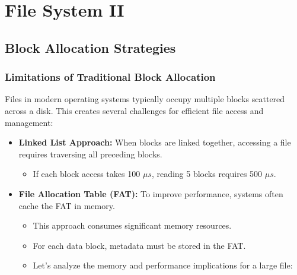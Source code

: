\chapter{File System II}
\vfill
\section{Block Allocation Strategies}
\subsection{Limitations of Traditional Block Allocation}

Files in modern operating systems typically occupy multiple blocks scattered across a disk. This creates several challenges for efficient file access and management:

\begin{itemize}
  \item \textbf{Linked List Approach:} When blocks are linked together, accessing a file requires traversing all preceding blocks.
    \begin{itemize}
      \item If each block access takes 100 $\mu s$, reading 5 blocks requires 500 $\mu s$.
    \end{itemize}
  
  \item \textbf{File Allocation Table (FAT):} To improve performance, systems often cache the FAT in memory.
    \begin{itemize}
      \item This approach consumes significant memory resources.
      \item For each data block, metadata must be stored in the FAT.
      \item Let's analyze the memory and performance implications for a large file:
    \end{itemize}
\end{itemize}

